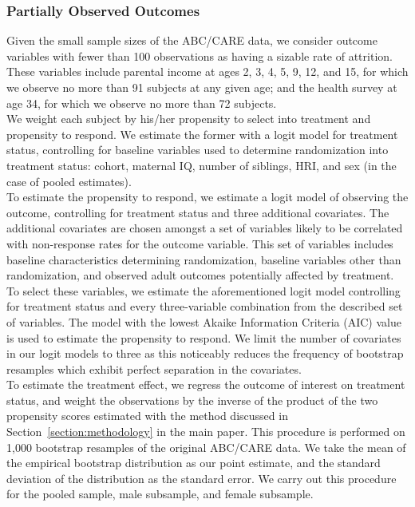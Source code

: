 \subsubsection{Partially Observed Outcomes}
\label{app:method_partialobs}

\noindent Given the small sample sizes of the ABC/CARE data, we consider outcome variables with fewer than 100 observations
as having a sizable rate of attrition. These variables include parental income at ages 2, 3, 4, 5, 9, 12,
and 15, for which we observe no more than 91 subjects at any given age; and the health survey at
age 34, for which we observe no more than 72 subjects. \\

\noindent We weight each subject by
his/her propensity to select into treatment and propensity to respond. We estimate the
former with a logit model for treatment status, controlling for baseline
variables used to determine randomization into treatment status: cohort,
maternal IQ, number of siblings, HRI, and sex (in the case of pooled estimates). \\

\noindent To estimate the propensity to respond, we estimate a logit model of observing the outcome,
controlling for treatment status and three additional covariates. The additional covariates are
chosen amongst a set of variables likely to be correlated with non-response rates for the outcome variable.
This set of variables includes baseline characteristics determining randomization,
baseline variables other than randomization, and observed adult outcomes potentially affected by
treatment. To select these variables, we estimate the
aforementioned logit model controlling for treatment status and every three-variable combination from
the described set of variables. The model with the lowest Akaike Information Criteria (AIC) value is used to estimate the propensity
to respond. We limit the number of covariates in our logit models to three as this noticeably reduces the frequency of bootstrap resamples which exhibit perfect separation in the covariates. \\

\noindent To estimate the treatment effect, we regress the outcome of interest on treatment status, and weight the
observations by the inverse of the product of the two propensity scores estimated with the method
discussed in Section~\ref{section:methodology} in the main paper. This procedure is performed on 1,000 bootstrap resamples of the original ABC/CARE data.
We take the mean of the empirical bootstrap distribution as our point estimate, and the standard deviation
of the distribution as the standard error. We carry out this procedure for the
pooled sample, male subsample, and female subsample. \\

